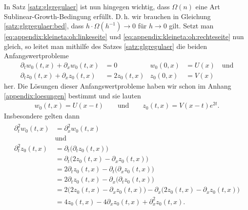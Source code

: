 In Satz \ref{satz:glgregulaer} ist nun hingegen wichtig, dass $\Omega(n)$ eine Art Sublinear-Growth-Bedingung erfüllt.
D.\,h. wir brauchen in Gleichung \eqref{satz:glgregulaer:bed}, dass $h \cdot \Omega\left( h^{-1} \right) \to 0$ für $h \to 0$ gilt. 
Setzt man \eqref{eq:appendix:kleineta:oh:linkeseite} und \eqref{eq:appendix:kleineta:oh:rechteseite} nun gleich, so leitet man mithilfe des Satzes \ref{satz:glgregulaer} die beiden Anfangswertprobleme
\begin{align}\label{eq:appendix:kleineta:oh}
\partial_t w_0(t,x) + \partial_x w_0(t,x) &= 0 &w_0(0,x) &= U(x) \quad \text{und}\\
\partial_t z_0(t,x) + \partial_x z_0(t,x) &= 2 z_0(t,x)  &z_0(0,x) &= V(x) 
\end{align}
her. Die Lösungen dieser Anfangswertprobleme haben wir schon im Anhang \ref{appendix:loesungen} bestimmt und sie lauten
\begin{align}
w_0(t,x) = U(x - t) \qquad \text{und} \qquad z_0(t,x) = V(x - t) e^{2 t}.
\end{align}
Insbesondere gelten dann
\begin{align}\label{eq:appendix:kleineta:korollar:h2}
\begin{split}
\partial^2_t w_0(t,x) &= \partial^2_x w_0(t,x)\qquad\\&\text{und}\\
\partial^2_t z_0(t,x) &= \partial_t \bigl( \partial_t z_0(t,x) \bigr)\\
&= \partial_t \bigl( 2z_0(t,x)  - \partial_x z_0(t,x) \bigr)\\
&= 2 \partial_t z_0(t,x) - \partial_t \bigl( \partial_x z_0(t,x) \bigr)\\
&= 2 \partial_t z_0(t,x) - \partial_x \bigl( \partial_t z_0(t,x) \bigr)\\
&= 2 \bigl( 2z_0(t,x) - \partial_x z_0(t,x) \bigr) - \partial_x \bigl( 2 z_0(t,x) - \partial_x z_0(t,x) \bigr)\\
&= 4 z_0(t,x) - 4 \partial_x z_0(t,x) + \partial^2_x z_0(t,x).
\end{split}
\end{align}

